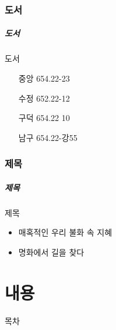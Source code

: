 \documentclass[aspectratio=1610,12pt,xcolor=pdftex,dvipsnames,table,handout]{beamer}
\begin{document}
		\section{도서}
		\begin{frame} [t,plain]
		\frametitle{도서}
			\begin{block} {도서}
			\setlength{\leftmargini}{5em}			
			\begin{itemize}
				\item [중앙] 654.22-23
				\item [수정] 652.22-12
				\item [구덕] 654.22 10
				\item [남구] 654.22-강55
			\end{itemize}
			\end{block}			

								
		\end{frame}						
	

		\section{ 제목 }
		\begin{frame} [t,plain]
		\frametitle{ 제목 }
			\begin{block} { 제목 }
			\setlength{\leftmargini}{5em}			
			\begin{itemize}
				\item 매혹적인 우리 불화 속 지혜
				\item 명화에서 길을 찾다
			\end{itemize}
			\end{block}			

								
		\end{frame}						

		\part{ 내용 }
		\frame{\partpage}

		\begin{frame} [plain]{목차}
		\tableofcontents%
		\end{frame}



\end{document}
